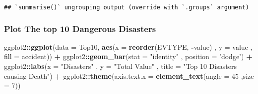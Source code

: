 \documentclass[
]{article}
\newenvironment{Shaded}{\begin{snugshade}}{\end{snugshade}}
\newcommand{\CommentTok}[1]{\textcolor[rgb]{0.56,0.35,0.01}{\textit{#1}}}
\newcommand{\DataTypeTok}[1]{\textcolor[rgb]{0.13,0.29,0.53}{#1}}
\newcommand{\DecValTok}[1]{\textcolor[rgb]{0.00,0.00,0.81}{#1}}
\newcommand{\KeywordTok}[1]{\textcolor[rgb]{0.13,0.29,0.53}{\textbf{#1}}}
\newcommand{\NormalTok}[1]{#1}
\newcommand{\OperatorTok}[1]{\textcolor[rgb]{0.81,0.36,0.00}{\textbf{#1}}}
\newcommand{\StringTok}[1]{\textcolor[rgb]{0.31,0.60,0.02}{#1}}
\begin{document}
\begin{verbatim}
## `summarise()` ungrouping output (override with `.groups` argument)
\end{verbatim}

\begin{Shaded}
\end{Shaded}

\hypertarget{plot-the-top-10-dangerous-disasters}{%
\subsubsection{Plot The top 10 Dangerous
Disasters}\label{plot-the-top-10-dangerous-disasters}}

\begin{Shaded}
\begin{Highlighting}[]
\NormalTok{ggplot2}\OperatorTok{::}\KeywordTok{ggplot}\NormalTok{(}\DataTypeTok{data =}\NormalTok{ Top10, }\KeywordTok{aes}\NormalTok{(}\DataTypeTok{x =} \KeywordTok{reorder}\NormalTok{(EVTYPE, }\OperatorTok{-}\NormalTok{value) , }\DataTypeTok{y =}\NormalTok{ value , }\DataTypeTok{fill =}\NormalTok{ accident)) }\OperatorTok{+}
\StringTok{        }\NormalTok{ggplot2}\OperatorTok{::}\KeywordTok{geom_bar}\NormalTok{(}\DataTypeTok{stat =} \StringTok{"identity"}\NormalTok{ , }\DataTypeTok{position =} \StringTok{'dodge'}\NormalTok{) }\OperatorTok{+}
\StringTok{        }\NormalTok{ggplot2}\OperatorTok{::}\KeywordTok{labs}\NormalTok{(}\DataTypeTok{x =} \StringTok{"Disasters"}\NormalTok{ , }\DataTypeTok{y =} \StringTok{"Total Value"}\NormalTok{ , }\DataTypeTok{title =} \StringTok{"Top 10 Disasters causing Death"}\NormalTok{) }\OperatorTok{+}
\StringTok{        }\NormalTok{ggplot2}\OperatorTok{::}\KeywordTok{theme}\NormalTok{(}\DataTypeTok{axis.text.x =} \KeywordTok{element_text}\NormalTok{(}\DataTypeTok{angle =} \DecValTok{45}\NormalTok{ ,}\DataTypeTok{size =} \DecValTok{7}\NormalTok{)) }
\end{Highlighting}
\end{Shaded}
\end{document}
